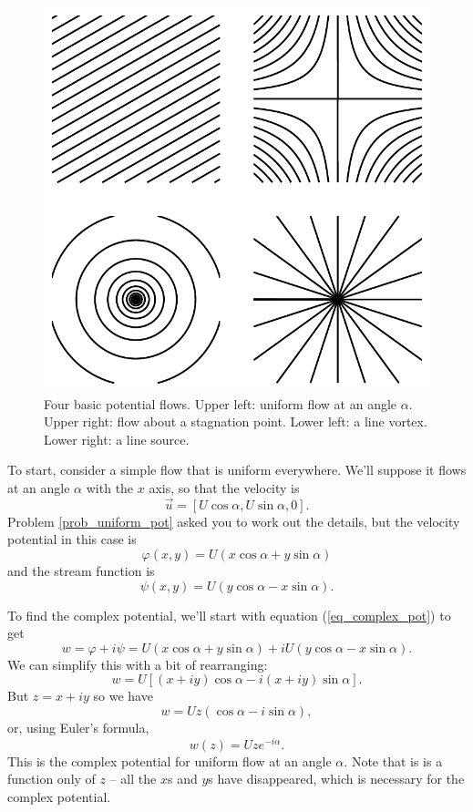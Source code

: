\begin{figure}
\centering\includegraphics[width=0.6\linewidth]{Figures/Chapter4/fig_basic_flows}
\caption{Four basic potential flows.  Upper left: uniform flow at an angle $\alpha$.  Upper right: flow about a stagnation point.  Lower left: a line vortex.  Lower right: a line source.}
\label{fig_basic_flows}
\end{figure}

\begin{example}
To start, consider a simple flow that is uniform everywhere.  We'll suppose it flows at an angle $\alpha$ with the $x$ axis, so that the velocity is
\begin{equation}
\vec{u} = [U\cos \alpha, U\sin \alpha, 0].
\end{equation}
Problem \ref{prob_uniform_pot} asked you to work out the details, but the velocity potential in this case is
\begin{equation}
\varphi (x, y) = U(x \cos\alpha + y\sin\alpha)
\end{equation}
and the stream function is
\begin{equation}
\psi (x, y) = U(y \cos\alpha - x\sin\alpha).
\end{equation}

To find the complex potential, we'll start with equation (\ref{eq_complex_pot}) to get
\[
w = \varphi + i\psi = U(x \cos\alpha + y\sin\alpha) + iU(y \cos\alpha - x\sin\alpha).
\]
We can simplify this with a bit of rearranging:
\[
w = U \left[ (x+iy) \cos\alpha - i(x+iy) \sin\alpha \right].
\]
But $z = x+iy$ so we have
\[
w = Uz(\cos\alpha - i\sin\alpha),
\]
or, using Euler's formula,
\begin{equation}
w(z) = Uze^{-i\alpha}.
\end{equation}
This is the complex potential for uniform flow at an angle $\alpha$.  Note that is is a function only of $z$ -- all the $x$s and $y$s have disappeared, which is necessary for the complex potential.
\end{example}


